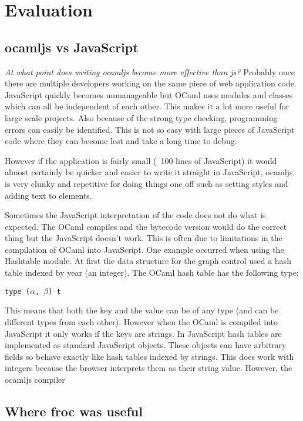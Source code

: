 \chapter{Evaluation}

\section{ocamljs vs JavaScript}
\emph{At what point does writing ocamljs become more effective than js?} Probably once there are multiple developers working on the same piece of web application code. JavaScript quickly becomes unmanageable but OCaml uses modules and classes which can all be independent of each other. This makes it a lot more useful for large scale projects. Also because of the strong type checking, programming errors can easily be identified. This is not so easy with large pieces of JavaScript code where they can become lost and take a long time to debug.

However if the application is fairly small (~100 lines of JavaScript) it would almost certainly be quicker and easier to write it straight in JavaScript, ocamljs is very clunky and repetitive for doing things one off such as setting styles and adding text to elements.

Sometimes the JavaScript interpretation of the code does not do what is expected. The OCaml compiles and the bytecode version would do the correct thing but the JavaScript doesn't work. This is often due to limitations in the compilation of OCaml into JavaScript. One example occurred when using the Hashtable module. At first the data structure for the graph control used a hash table indexed by year (an integer). The OCaml hash table has the following type:

\begin{center}
\texttt{type ($\alpha$, $\beta$) t}
\end{center}

This means that both the key and the value can be of any type (and can be different types from each other). However when the OCaml is compiled into JavaScript it only works if the keys are strings. In JavaScript hash tables are implemented as standard JavaScript objects. These objects can have arbitrary fields so behave exactly like hash tables indexed by strings. This does work with integers because the browser interprets them as their string value. However, the ocamljs compiler

\section{Where froc was useful}
